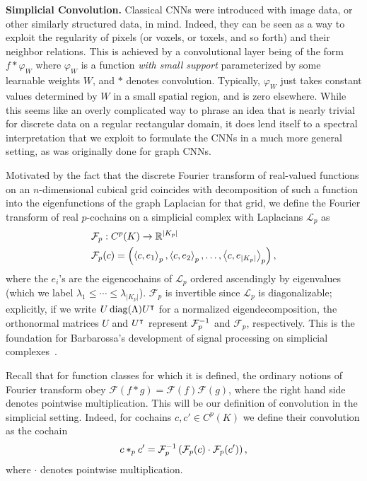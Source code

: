 
\textbf{Simplicial Convolution.} Classical CNNs were introduced with image data, or other similarly structured data, in mind. Indeed, they can be seen as a way to exploit the regularity of pixels (or voxels, or toxels, and so forth) and their neighbor relations.  This is achieved by a convolutional layer being of the form $f\ast \varphi_W$ where $\varphi_W$ is a function \emph{with small support} parameterized by some learnable weights $W$, and $\ast$ denotes convolution. Typically, $\varphi_W$ just takes constant values determined by $W$ in a small spatial region, and is zero elsewhere. While this seems like an overly complicated way to phrase an idea that is nearly trivial for discrete data on a regular rectangular domain, it does lend itself to a spectral interpretation that we exploit to formulate the CNNs in a much more general setting, as was originally done for graph CNNs.

Motivated by the fact that the discrete Fourier transform of real-valued functions on an $n$-dimensional cubical grid coincides with decomposition of such a function into the eigenfunctions of the graph Laplacian for that grid, we define the Fourier transform of real $p$-cochains on a simplicial complex with Laplacians $\mathcal{L}_p$ as
\begin{align*}
  &\mathcal{F}_p: C^p(K) \to \mathbb{R}^{\lvert K_p \rvert} \\
  &\mathcal{F}_p(c) = \left(\left\langle c , e_1 \right\rangle_p, \left\langle c , e_2 \right\rangle_p, \dotsc, \left\langle c , e_{\lvert K_p \rvert} \right\rangle_p\right),
\end{align*}
where the $e_i$'s are the eigencochains of $\mathcal{L}_p$ ordered ascendingly by eigenvalues (which we label $\lambda_1\leq\dotsm\leq\lambda_{\lvert K_p \rvert}$). $\mathcal{F}_p$ is invertible since $\mathcal{L}_p$ is diagonalizable; explicitly, if we write $U\operatorname{diag}(\Lambda)U^{\intercal}$ for a normalized eigendecomposition, the orthonormal matrices $U$ and $U^{\intercal}$ represent $\mathcal{F}^{-1}_p$ and $\mathcal{F}_p$, respectively. This is the foundation for Barbarossa's development of signal processing on simplicial complexes~\cite{barbarossa2018learning}.

Recall that for function classes for which it is defined, the ordinary notions of Fourier transform obey $\mathcal{F}(f\ast g)=\mathcal{F}(f)\mathcal{F}(g)$, where the right hand side denotes pointwise multiplication. This will be our definition of convolution in the simplicial setting. Indeed, for cochains $c,c'\in C^p(K)$ we define their convolution as the cochain
\begin{equation*}
  c\ast_p c' = \mathcal{F}_p^{-1}\left(\mathcal{F}_p(c)\cdot\mathcal{F}_p(c')\right),
\end{equation*}
where $\cdot$ denotes pointwise multiplication.

